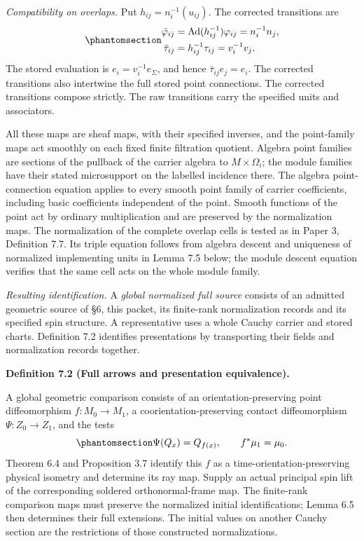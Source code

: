 \documentclass[
  english,
  11pt,
  reqno]{amsart}
\makeatletter
\newcommand{\pandocstatementheading}[1]{%
  \par\if@nobreak\else
    \addpenalty{\@beginparpenalty}%
    \addvspace{.5\baselineskip plus .2\baselineskip minus .2\baselineskip}%
  \fi
  {\normalfont\bfseries #1\par}%
  \nobreak\@afterindenttrue\@afterheading
}
\makeatother
\begin{document}
\emph{Compatibility on overlaps.} Put \(h_{ij}=n_i^{-1}(u_{ij})\). The
corrected transitions are
\begin{equation}\protect\phantomsection\label{eq:global-corrected-stored-transitions}{
\begin{aligned}
\bar\varphi_{ij}
 &=\operatorname{Ad}(h_{ij}^{-1})\varphi_{ij}
 =n_i^{-1}n_j,\\
\bar\tau_{ij}
 &=h_{ij}^{-1}\tau_{ij}
 =v_i^{-1}v_j.
\end{aligned}
}\end{equation} The stored evaluation is \(e_i=v_i^{-1}e_\Sigma\), and
hence \(\bar\tau_{ij}e_j=e_i\). The corrected transitions also
intertwine the full stored point connections. The corrected transitions
compose strictly. The raw transitions carry the specified units and
associators.

All these maps are sheaf maps, with their specified inverses, and the
point-family maps act smoothly on each fixed finite filtration quotient.
Algebra point families are sections of the pullback of the carrier
algebra to \(M\times\Omega_i\); the module families have their stated
microsupport on the labelled incidence there. The algebra
point-connection equation applies to every smooth point family of
carrier coefficients, including basic coefficients independent of the
point. Smooth functions of the point act by ordinary multiplication and
are preserved by the normalization maps. The normalization of the
complete overlap cells is tested as in Paper 3, Definition 7.7. Its
triple equation follows from algebra descent and uniqueness of
normalized implementing units in Lemma 7.5 below; the module descent
equation verifies that the same cell acts on the whole module family.

\emph{Resulting identification.} A \emph{global normalized full source}
consists of an admitted geometric source of §6, this packet, its
finite-rank normalization records and its specified spin structure. A
representative uses a whole Cauchy carrier and stored charts. Definition
7.2 identifies presentations by transporting their fields and
normalization records together.

\pandocstatementheading{\protect{}\label{def:global-full-source-arrows}Definition 7.2 (Full arrows and presentation equivalence).}

A global geometric comparison consists of an orientation-preserving
point diffeomorphism \(f:M_0\to M_1\), a coorientation-preserving
contact diffeomorphism \(\Psi:Z_0\to Z_1\), and the tests
\begin{equation}\protect\phantomsection\label{eq:global-geometric-arrow-tests}{
\Psi(Q_x)=Q_{f(x)},\qquad f^*\mu_1=\mu_0.
}\end{equation} Theorem 6.4 and Proposition 3.7 identify this \(f\) as a
time-orientation-preserving physical isometry and determine its ray map.
Supply an actual principal spin lift of the corresponding soldered
orthonormal-frame map. The finite-rank comparison maps must preserve the
normalized initial identifications; Lemma 6.5 then determines their full
extensions. The initial values on another Cauchy section are the
restrictions of those constructed normalizations.
\end{document}
